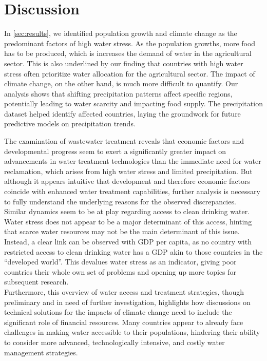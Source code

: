 \documentclass{article}
\theoremstyle{plain}
\theoremstyle{definition}
\theoremstyle{remark}
\begin{document}



\section{Discussion}
In \autoref{sec:results}, we identified population growth and climate change as the predominant factors of high water stress. As the population growths, more food has to be produced, which is increases the demand of water in the agricultural sector. This is also underlined by our finding that countries with high water stress often prioritize water allocation for the agricultural sector. The impact of climate change, on the other hand, is much more difficult to quantify. Our analysis shows that shifting precipitation patterns affect specific regions, potentially leading to water scarcity and impacting food supply. The precipitation dataset helped identify affected countries, laying the groundwork for future predictive models on precipitation trends.

The examination of wastewater treatment reveals that economic factors and developmental progress seem to exert a significantly greater impact on advancements in water treatment technologies than the immediate need for water reclamation, which arises from high water stress and limited precipitation. But although it appears intuitive that development and therefore economic factors coincide with enhanced water treatment capabilities, further analysis is necessary to fully understand the underlying reasons for the observed discrepancies.\\
Similar dynamics seem to be at play regarding access to clean drinking water. Water stress does not appear to be a major determinant of this access, hinting that scarce water resources may not be the main determinant of this issue. Instead, a clear link can be observed with GDP per capita, as no country with restricted access to clean drinking water has a GDP akin to those countries in the “developed world”. This devalues water stress as an indicator, giving poor countries their whole own set of problems and opening up more topics for subsequent research.\\
Furthermore, this overview of water access and treatment strategies, though preliminary and in need of further investigation, highlights how discussions on technical solutions for the impacts of climate change need to include the significant role of financial resources. Many countries appear to already face challenges in making water accessible to their populations, hindering their ability to consider more advanced, technologically intensive, and costly water management strategies.
\end{document}
